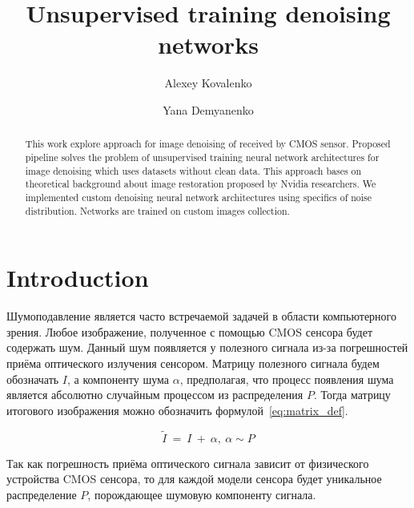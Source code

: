 \documentclass[runningheads]{llncs}
\begin{document}
%
\title{Unsupervised training denoising networks}
%
%
\author{Alexey Kovalenko \and
Yana Demyanenko}
%
%
%
\maketitle              %
%
\begin{abstract}
This work explore approach for image denoising of received by CMOS sensor. Proposed pipeline solves the problem of unsupervised training neural network architectures for image denoising which uses datasets without clean data. This approach bases on theoretical background about image restoration proposed by Nvidia researchers. We implemented custom denoising neural network architectures using specifics of noise distribution. Networks are trained on custom images collection.

\end{abstract}
%
%
%
\section{Introduction}
Шумоподавление является часто встречаемой задачей в области компьютерного зрения. Любое изображение, полученное с помощью CMOS сенсора будет содержать шум. Данный шум появляется у полезного сигнала из-за погрешностей приёма оптического излучения сенсором. Матрицу полезного сигнала будем обозначать $I$, а компоненту шума $\alpha$, предполагая, что процесс появления шума является абсолютно случайным процессом из распределения $\mathit{P}$. Тогда матрицу итогового изображения можно обозначить формулой~\ref{eq:matrix_def}.

\begin{equation}\label{eq:matrix_def}
\tilde{I}\ =\ I\ +\ \alpha,\ \alpha \sim \mathit{P}
\end{equation}

Так как погрешность приёма оптического сигнала зависит от физического устройства CMOS сенсора, то для каждой модели сенсора будет уникальное распределение $\mathit{P}$, порождающее шумовую компоненту сигнала.
\end{document}
